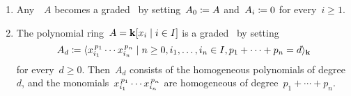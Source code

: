 \begin{examples}
  \label{examples of graded algebras}
  \leavevmode
  \begin{enumerate}
    \item
      Any~\algebra{$\kf$}~$A$ becomes a graded~\algebra{$\kf$} by setting~$A_0 \coloneqq A$ and~$A_i \coloneqq 0$ for every~$i \geq 1$.
    \item
      The polynomial ring~$A = \kf[x_i \suchthat i \in I]$ is a graded~\algebra{$\kf$} by setting
      \[
        A_d
        \defined
        \gen{
          x_{i_1}^{\spacing p_1} \dotsm x_{i_n}^{\spacing p_n}
        \suchthat
          n \geq 0,
          i_1, \dotsc, i_n \in I,
          p_1 + \dotsb + p_n = d
        }_{\kf}
      \]
      for every~$d \geq 0$.
      Then~$A_d$ consists of the homogeneous polynomials of degree~$d$, and the monomials~$x_{i_1}^{\, p_1} \dotsm x_{i_n}^{\, p_n}$ are homogeneous of degree~$p_1 + \dotsb + p_n$.
      

\end{enumerate}
\end{examples}
